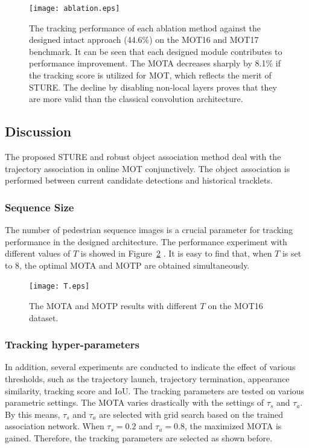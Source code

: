 \documentclass[times,twocolumn,final,authoryear]{elsarticle}
\begin{document}
\begin{figure}[!ht]
	\centering
	\texttt{[image: ablation.eps]}
	\caption{The tracking performance of each ablation method against the designed intact approach (44.6$\%$) on the MOT16 and MOT17 benchmark. 
		It can be seen that each designed module contributes to performance improvement.
		The MOTA decreases sharply by 8.1$\%$ if the tracking score is utilized for MOT, which reflects the merit of STURE. 
		The decline by disabling non-local layers proves that {they} are more valid than the classical convolution architecture.}
	\label{fig:ablation}
\end{figure}


\subsection{Discussion}  
The proposed STURE and robust object association method deal with the trajectory association in online MOT conjunctively. 
The object association is performed between current candidate detections and historical tracklets.

\vspace{5pt}
\noindent
\subsubsection{Sequence Size}
The number of pedestrian sequence images is a crucial parameter for tracking performance in the designed architecture.
The performance experiment with different values of $T$ is showed in Figure~\ref{fig:T} .
It is easy to find that, when $T$ is set to $8$, the optimal MOTA and MOTP are obtained simultaneously.


\begin{figure}[!ht]
	\centering
	\texttt{[image: T.eps]}
	\caption{The MOTA and MOTP results with different $T$ on the MOT16 dataset.}
	\label{fig:T}
\end{figure}

\vspace{5pt}
\noindent
\subsubsection{Tracking hyper-parameters}
In addition, several experiments are conducted to indicate the effect of various thresholds, such as the trajectory launch, trajectory termination, appearance similarity, tracking score and IoU.
The tracking parameters are tested on various parametric settings. 
The MOTA varies drastically with the settings of $\tau_s$ and $\tau_a$. 
By this means, $ \tau _s $ and $ \tau _a $ are selected with grid search based on the trained association network. 
When $ \tau _s=0.2 $ and $ \tau _a=0.8 $, the maximized MOTA is gained. 
Therefore, the tracking parameters are selected as shown before.
\end{document}
